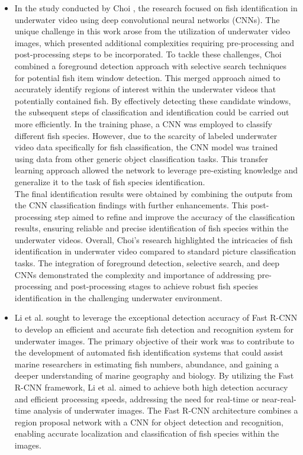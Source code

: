 \begin{itemize}
    \item In the study conducted by Choi \cite{choi2015fish}, the research focused on fish identification in underwater video using deep convolutional neural networks (CNNs). The unique challenge in this work arose from the utilization of underwater video images, which presented additional complexities requiring pre-processing and post-processing steps to be incorporated. To tackle these challenges, Choi combined a foreground detection approach with selective search techniques for potential fish item window detection. This merged approach aimed to accurately identify regions of interest within the underwater videos that potentially contained fish. By effectively detecting these candidate windows, the subsequent steps of classification and identification could be carried out more efficiently. In the training phase, a CNN was employed to classify different fish species. However, due to the scarcity of labeled underwater video data specifically for fish classification, the CNN model was trained using data from other generic object classification tasks. This transfer learning approach allowed the network to leverage pre-existing knowledge and generalize it to the task of fish species identification.\\
    The final identification results were obtained by combining the outputs from the CNN classification findings with further enhancements. This post-processing step aimed to refine and improve the accuracy of the classification results, ensuring reliable and precise identification of fish species within the underwater videos. Overall, Choi's research highlighted the intricacies of fish identification in underwater video compared to standard picture classification tasks. The integration of foreground detection, selective search, and deep CNNs demonstrated the complexity and importance of addressing pre-processing and post-processing stages to achieve robust fish species identification in the challenging underwater environment.
    \item Li et al. \cite{li2015fast} sought to leverage the exceptional detection accuracy of Fast R-CNN to develop an efficient and accurate fish detection and recognition system for underwater images. The primary objective of their work was to contribute to the development of automated fish identification systems that could assist marine researchers in estimating fish numbers, abundance, and gaining a deeper understanding of marine geography and biology. By utilizing the Fast R-CNN framework, Li et al. aimed to achieve both high detection accuracy and efficient processing speeds, addressing the need for real-time or near-real-time analysis of underwater images. The Fast R-CNN architecture combines a region proposal network with a CNN for object detection and recognition, enabling accurate localization and classification of fish species within the images.\\

\end{itemize}
